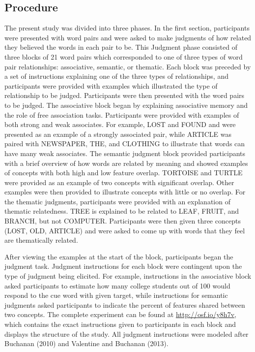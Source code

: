 \documentclass[english,man]{apa6}
\theoremstyle{definition}
\theoremstyle{definition}
\theoremstyle{remark}
\begin{document}
\subsection{Procedure}\label{procedure}

The present study was divided into three phases. In the first section,
participants were presented with word pairs and were asked to make
judgments of how related they believed the words in each pair to be.
This Judgment phase consisted of three blocks of 21 word pairs which
corresponded to one of three types of word pair relationships:
associative, semantic, or thematic. Each block was preceded by a set of
instructions explaining one of the three types of relationships, and
participants were provided with examples which illustrated the type of
relationship to be judged. Participants were then presented with the
word pairs to be judged. The associative block began by explaining
associative memory and the role of free association tasks. Participants
were provided with examples of both strong and weak associates. For
example, LOST and FOUND and were presented as an example of a strongly
associated pair, while ARTICLE was paired with NEWSPAPER, THE, and
CLOTHING to illustrate that words can have many weak associates. The
semantic judgment block provided participants with a brief overview of
how words are related by meaning and showed examples of concepts with
both high and low feature overlap. TORTOISE and TURTLE were provided as
an example of two concepts with significant overlap. Other examples were
then provided to illustrate concepts with little or no overlap. For the
thematic judgments, participants were provided with an explanation of
thematic relatedness. TREE is explained to be related to LEAF, FRUIT,
and BRANCH, but not COMPUTER. Participants were then given three
concepts (LOST, OLD, ARTICLE) and were asked to come up with words that
they feel are thematically related.

After viewing the examples at the start of the block, participants began
the judgment task. Judgment instructions for each block were contingent
upon the type of judgment being elicited. For example, instructions in
the associative block asked participants to estimate how many college
students out of 100 would respond to the cue word with given target,
while instructions for semantic judgments asked participants to indicate
the percent of features shared between two concepts. The complete
experiment can be found at \url{http://osf.io/y8h7v}, which contains the
exact instructions given to participants in each block and displays the
structure of the study. All judgment instructions were modeled after
Buchanan (2010) and Valentine and Buchanan (2013).
\end{document}
